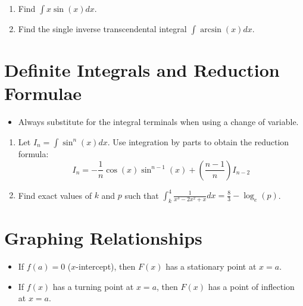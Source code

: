 \documentclass[12pt]{article}
\begin{document}
 \begin{enumerate} 
     \item Find $\displaystyle \int x \sin(x) dx$. 
     \vspace{2cm} 
     \item Find the single inverse transcendental integral $\displaystyle \int \arcsin(x) dx$. 
 \end{enumerate} 

 \section*{Definite Integrals and Reduction Formulae} 
 \begin{itemize} 
     \item Always substitute for the integral terminals when using a change of variable. 
 \end{itemize} 

 \begin{enumerate} 
     \item Let $I_{n}=\int \sin^{n}(x)dx$. Use integration by parts to obtain the reduction formula: 
     $$I_{n}=-\frac{1}{n}\cos(x)\sin^{n-1}(x)+\left(\frac{n-1}{n}\right)I_{n-2}$$
     \vspace{3cm} 
     \item Find exact values of $k$ and $p$ such that $\displaystyle \int_{k}^{4}\frac{1}{x^{3}-2x^{2}+x}dx=\frac{8}{3}-\log_{e}(p)$. 
 \end{enumerate} 

 \section*{Graphing Relationships} 
 \begin{itemize} 
     \item If $f(a)=0$ ($x$-intercept), then $F(x)$ has a stationary point at $x=a$. 
     \item If $f(x)$ has a turning point at $x=a$, then $F(x)$ has a point of inflection at $x=a$. 
 \end{itemize} 

 
\end{document}

